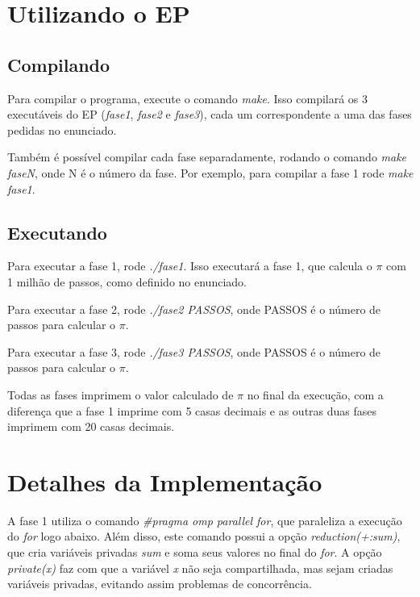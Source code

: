 




\cabecalho

\section{Utilizando o EP}

\subsection{Compilando}

Para compilar o programa, execute o comando \emph{make}. Isso compilará os 3 
executáveis do EP (\emph{fase1}, \emph{fase2} e \emph{fase3}), cada um 
correspondente a uma das fases pedidas no enunciado.

Também é possível compilar cada fase separadamente, rodando o comando 
\emph{make faseN}, onde N é o número da fase. Por exemplo, para compilar a
fase 1 rode \emph{make fase1}.

\subsection{Executando}

Para executar a fase 1, rode \emph{./fase1}. Isso executará a fase 1, que
calcula o $\pi$ com 1 milhão de passos, como definido no enunciado.

Para executar a fase 2, rode \emph{./fase2 PASSOS}, onde PASSOS é o número
de passos para calcular o $\pi$.

Para executar a fase 3, rode \emph{./fase3 PASSOS}, onde PASSOS é o número
de passos para calcular o $\pi$.

Todas as fases imprimem o valor calculado de $\pi$ no final da execução, com
a diferença que a fase 1 imprime com 5 casas decimais e as outras duas fases
imprimem com 20 casas decimais.

\section{Detalhes da Implementação}

A fase 1 utiliza o comando \emph{\#pragma omp parallel for}, que paraleliza a
execução do \emph{for} logo abaixo. Além disso, este comando possui a opção
\emph{reduction(+:sum)}, que cria variáveis privadas \emph{sum} e soma seus
valores no final do \emph{for}. A opção \emph{private(x)} faz com que a
variável \emph{x} não seja compartilhada, mas sejam criadas variáveis privadas,
evitando assim problemas de concorrência.

